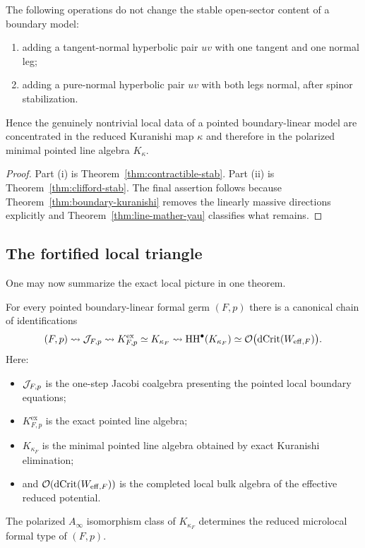 \begin{corollary}%
The following operations do not change the stable open-sector content of a boundary model:
\begin{enumerate}[label=(\roman*),leftmargin=1.8em]
\item adding a tangent-normal hyperbolic pair $u v$ with one tangent and one normal leg;
\item adding a pure-normal hyperbolic pair $uv$ with both legs normal, after spinor stabilization.
\end{enumerate}
Hence the genuinely nontrivial local data of a pointed boundary-linear model are concentrated in the reduced Kuranishi map $\kappa$ and therefore in the polarized minimal pointed line algebra $K_\kappa$.
\end{corollary}

\begin{proof}
Part (i) is Theorem~\ref{thm:contractible-stab}. Part (ii) is Theorem~\ref{thm:clifford-stab}. The final assertion follows because Theorem~\ref{thm:boundary-kuranishi} removes the linearly massive directions explicitly and Theorem~\ref{thm:line-mather-yau} classifies what remains.
\end{proof}

\subsection{The fortified local triangle}

One may now summarize the exact local picture in one theorem.

\begin{theorem}%
For every pointed boundary-linear formal germ $(F,p)$ there is a canonical chain of identifications
\[
(F,p)
\rightsquigarrow
\mathcal J_{F,p}
\rightsquigarrow
K^{\mathrm{ex}}_{F,p}
\simeq
K_{\kappa_F}
\rightsquigarrow
\operatorname{HH}^\bullet(K_{\kappa_F})
\simeq
\mathcal O\bigl(\operatorname{dCrit}(W_{\mathrm{eff},F})\bigr).
\]
Here:
\begin{itemize}[leftmargin=1.8em]
\item $\mathcal J_{F,p}$ is the one-step Jacobi coalgebra presenting the pointed local boundary equations;
\item $K^{\mathrm{ex}}_{F,p}$ is the exact pointed line algebra;
\item $K_{\kappa_F}$ is the minimal pointed line algebra obtained by exact Kuranishi elimination;
\item and $\mathcal O(\operatorname{dCrit}(W_{\mathrm{eff},F}))$ is the completed local bulk algebra of the effective reduced potential.
\end{itemize}
The polarized $A_\infty$ isomorphism class of $K_{\kappa_F}$ determines the reduced microlocal formal type of $(F,p)$.
\end{theorem}

